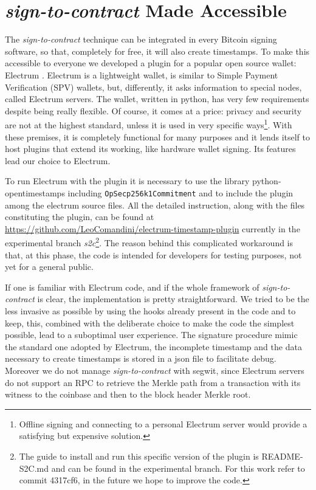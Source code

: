 \section{\textit{sign-to-contract} Made Accessible}
The \textit{sign-to-contract} technique can be integrated in every Bitcoin signing software, so that, completely for free, it will also create timestamps.
To make this accessible to everyone we developed a plugin for a popular open source wallet: Electrum \cite{ElectrumWeb, ElectrumGithub}. 
Electrum is a lightweight wallet, is similar to Simple Payment Verification (SPV) wallets, but, differently, it asks information to special nodes, called Electrum servers. The wallet, written in python, has very few requirements despite being really flexible. Of course, it comes at a price: privacy and security are not at the highest standard, unless it is used in very specific ways\footnote{Offline signing and connecting to a personal Electrum server would provide a satisfying but expensive solution.}.
With these premises, it is completely functional for many purposes and it lends itself to host plugins that extend its working, like hardware wallet signing. 
Its features lead our choice to Electrum.

To run Electrum with the plugin it is necessary to use the library python-opentimestamps including \verb|OpSecp256k1Commitment| and to include the plugin among the electrum source files. All the detailed instruction, along with the files constituting the plugin, can be found at \url{https://github.com/LeoComandini/electrum-timestamp-plugin} currently in the experimental branch \textit{s2c}\footnote{The guide to install and run this specific version of the plugin is README-S2C.md and can be found in the experimental branch. For this work refer to commit 4317cf6, in the future we hope to improve the code.}. The reason behind this complicated workaround is that, at this phase, the code is intended for developers for testing purposes, not yet for a general public.

If one is familiar with Electrum code, and if the whole framework of \textit{sign-to-contract} is clear, the implementation is pretty straightforward.  We tried to be the less invasive as possible by using the hooks already present in the code and to keep, this, combined with the deliberate choice to make the code the simplest possible, lead to a suboptimal user experience. 
The signature procedure mimic the standard one adopted by Electrum, the incomplete timestamp and the data necessary to create timestamps is stored in a json file to facilitate debug.
Moreover we do not manage \textit{sign-to-contract} with segwit, since Electrum servers do not support an RPC to retrieve the Merkle path from a transaction with its witness to the coinbase and then to the block header Merkle root.

